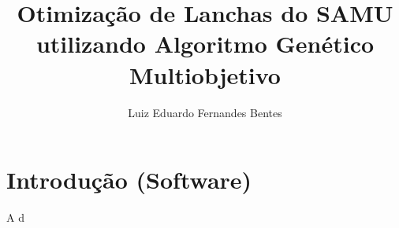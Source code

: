 \documentclass[]{article}
\title{Otimização de Lanchas do SAMU utilizando Algoritmo Genético Multiobjetivo}
\author{Luiz Eduardo Fernandes Bentes}
\begin{document}
\maketitle

\begin{abstract}

\end{abstract}

\section{Introdução (Software)}
A d
\end{document}
